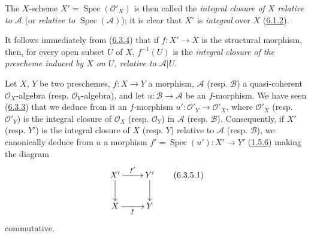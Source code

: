 The $X$-scheme $X'=\operatorname{Spec}(\mathcal{O}'_X)$ is then called the
\emph{integral closure of $X$ relative to $\mathcal{A}$} (or \emph{relative
to $\operatorname{Spec}(\mathcal{A})$}); it is clear that $X'$ is
\emph{integral} over $X$ (\hyperref[II.6.1.2]{6.1.2}).

It follows immediately from (\hyperref[II.6.3.4]{6.3.4}) that if
$f:X'\to X$ is the structural morphism, then, for every open subset $U$ of
$X$, $f^{-1}(U)$ is the \emph{integral closure of the prescheme induced by
$X$ on $U$, relative to $\mathcal{A}|U$}.

\begin{env}[6.3.5]
\label{II.6.3.5}
Let $X$, $Y$ be two preschemes, $f:X\to Y$ a morphism, $\mathcal{A}$ (resp.
$\mathcal{B}$) a quasi-coherent $\mathcal{O}_X$-algebra (resp.
$\mathcal{O}_Y$-algebra), and let $u:\mathcal{B}\to\mathcal{A}$ be an
$f$-morphism. We have seen (\hyperref[II.6.3.3]{6.3.3}) that we deduce
from it an $f$-morphism $u':\mathcal{O}'_Y\to\mathcal{O}'_X$, where
$\mathcal{O}'_X$ (resp. $\mathcal{O}'_Y$) is the integral closure of
$\mathcal{O}_X$ (resp. $\mathcal{O}_Y$) in $\mathcal{A}$ (resp.
$\mathcal{B}$). Consequently, if $X'$ (resp. $Y'$) is the integral closure of
$X$ (resp. $Y$) relative to $\mathcal{A}$ (resp. $\mathcal{B}$), we
canonically deduce from $u$ a morphism $f'=\operatorname{Spec}(u'):X'\to Y'$
(\hyperref[II.1.5.6]{1.5.6}) making the diagram
\[
\label{II.6.3.5.1}
\xymatrix{
X'\ar[r]^{f'}\ar[d]&Y'\ar[d]\\
X\ar[r]_{f}&Y
}
\tag{6.3.5.1}
\]
commutative.
\end{env}

